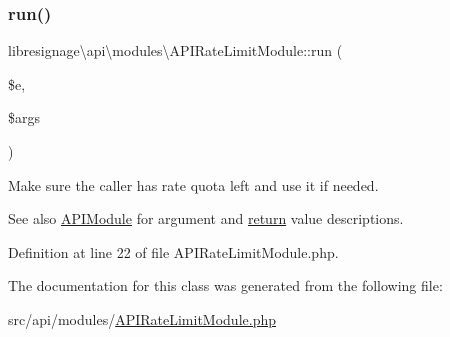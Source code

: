 \subsubsection{\texorpdfstring{run()}{run()}}
{\footnotesize\ttfamily libresignage\textbackslash{}api\textbackslash{}modules\textbackslash{}\+A\+P\+I\+Rate\+Limit\+Module\+::run (\begin{DoxyParamCaption}\item[{\hyperlink{classlibresignage_1_1api_1_1APIEndpoint}{A\+P\+I\+Endpoint}}]{\$e,  }\item[{array}]{\$args }\end{DoxyParamCaption})}

Make sure the caller has rate quota left and use it if needed.

\begin{DoxySeeAlso}{See also}
\hyperlink{classlibresignage_1_1api_1_1APIModule}{A\+P\+I\+Module} for argument and \hyperlink{quota_200-default_8php_ae057f510746f2e7dcbd7d8ccfaf92a45}{return} value descriptions. 
\end{DoxySeeAlso}


Definition at line 22 of file A\+P\+I\+Rate\+Limit\+Module.\+php.



The documentation for this class was generated from the following file\+:\begin{DoxyCompactItemize}
\item 
src/api/modules/\hyperlink{APIRateLimitModule_8php}{A\+P\+I\+Rate\+Limit\+Module.\+php}\end{DoxyCompactItemize}
